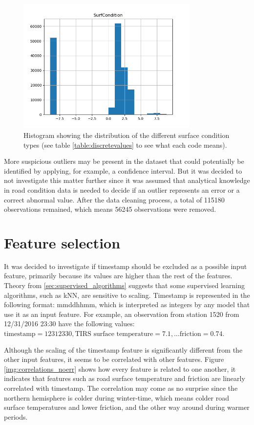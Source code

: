 \begin{figure}[H] 
	\centering
	\includegraphics[width=0.8\textwidth]{media/HistogramSurfaceStatus.png}
	\caption{Histogram showing the distribution of the different surface condition types (see table \ref{table:discretevalues} to see what each code means).}
	\label{img:histogram_surfstatus}
\end{figure}

	More suspicious outliers may be present in the dataset that could potentially be identified by applying, for example, a confidence interval. But it was decided to not investigate this matter further since it was assumed that analytical knowledge in road condition data is needed to decide if an outlier represents an error or a correct abnormal value. After the data cleaning process, a total of 115180 observations remained, which means 56245 observations were removed.


\section{Feature selection}
	It was decided to investigate if timestamp should be excluded as a possible input feature, primarily because its values are higher than the rest of the features. Theory from \ref{sec:supervised_algorithms} suggests that some supervised learning algorithms, such as kNN, are sensitive to scaling. Timestamp is represented in the following format: mmddhhmm, which is interpreted as integers by any model that use it as an input feature. For example, an observation from station 1520 from 12/31/2016 23:30 have the following values: $\text{timestamp} = 12312330, \text{TIRS surface temperature}= 7.1, \dots \text{friction} = 0.74$. 

	Although the scaling of the timestamp feature is significantly different from the other input features, it seems to be correlated with other features. Figure \ref{img:correlations_noerr} shows how every feature is related to one another, it indicates that features such as road surface temperature and friction are linearly correlated with timestamp. The correlation may come as no surprise since the northern hemisphere is colder during winter-time, which means colder road surface temperatures and lower friction, and the other way around during warmer periods. 

